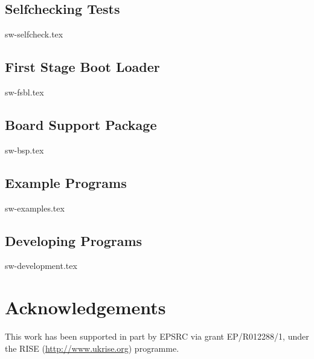 \documentclass{scarv-report}
\begin{document}
\subsection{Selfchecking Tests}
{sw-selfcheck.tex}

\subsection{First Stage Boot Loader}
\label{sec:sw:fsbl}
{sw-fsbl.tex}

\subsection{Board Support Package}
{sw-bsp.tex}

\subsection{Example Programs}
{sw-examples.tex}

\subsection{Developing Programs}
{sw-development.tex}

\section{Acknowledgements}

This work has been supported in part by EPSRC via grant EP/R012288/1,
under the RISE (\url{http://www.ukrise.org}) programme.


\MKEPILOGUE

\end{document}
